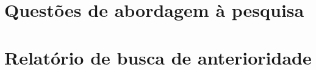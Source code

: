 \documentclass[
12pt,					%
openright,				%
twoside,				%
a4paper,				%
english,
brazil
]{ABNT/abntex2_report}
\begin{document}
	\newpage
	\begin{flushleft}
		\ABNTEXchapterfont\Large\textbf{\MakeUppercase\glosariotitlename}
	\end{flushleft}
	\vspace*{-36pt}
	\normalsize
	\normalfont
	\tableofcontents*
	\justify
	\setlength\beforechapskip{-24pt}
	\setlength\afterchapskip{12pt}
	\textual
	\pagestyle{plain}
	\normalsize
	\justify
	\normalfont
	
	
	
	
	
	\cleardoublepage
	\titleformat{\chapter}[display]{\vspace*{-24pt}\ABNTEXchapterfont\large\bfseries}{\chaptertitlename\ \thechapter}{12pt}{\Large}
	
	\apendices
	\justify
	\chapter{Questões de abordagem à pesquisa}
	\label{ape:quest}
	
	\anexos
	\justify
	\chapter{Relatório de busca de anterioridade}
	\label{ann:relant}
	
\end{document}
